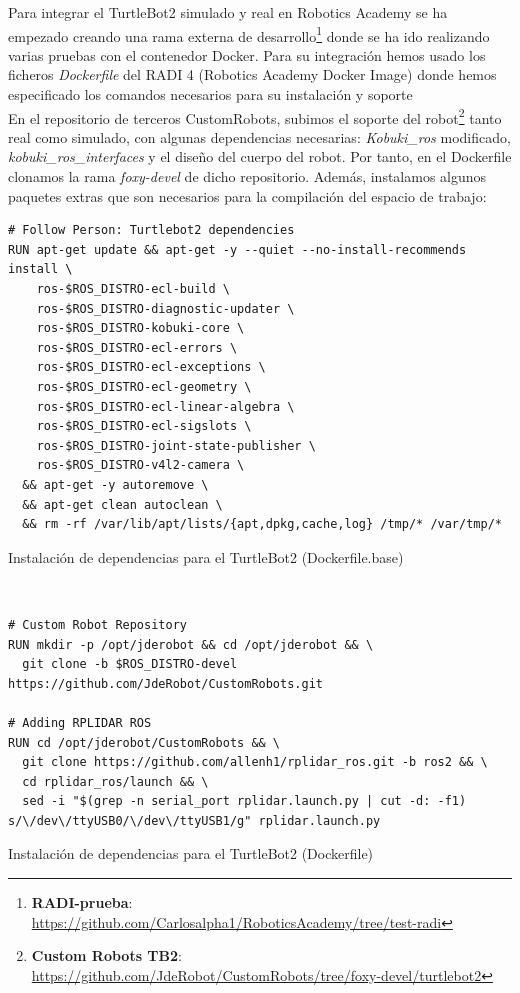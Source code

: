 Para integrar el TurtleBot2 simulado y real en Robotics Academy se ha empezado creando una rama externa de desarrollo\footnote{\textbf{RADI-prueba}: \url{https://github.com/Carlosalpha1/RoboticsAcademy/tree/test-radi}} donde se ha ido realizando varias pruebas con el contenedor Docker. Para su integración hemos usado los ficheros \textit{Dockerfile} del RADI 4 (Robotics Academy Docker Image) donde hemos especificado los comandos necesarios para su instalación y soporte\\

En el repositorio de terceros CustomRobots, subimos el soporte del robot\footnote{\textbf{Custom Robots TB2}: \url{https://github.com/JdeRobot/CustomRobots/tree/foxy-devel/turtlebot2}} tanto real como simulado, con algunas dependencias necesarias: \textit{Kobuki\_ros} modificado, \textit{kobuki\_ros\_interfaces} y el diseño del cuerpo del robot. Por tanto, en el Dockerfile clonamos la rama \textit{foxy-devel} de dicho repositorio. Además, instalamos algunos paquetes extras que son necesarios para la compilación del espacio de trabajo:

\begin{code}[H]
\begin{lstlisting}
# Follow Person: Turtlebot2 dependencies
RUN apt-get update && apt-get -y --quiet --no-install-recommends install \
    ros-$ROS_DISTRO-ecl-build \
    ros-$ROS_DISTRO-diagnostic-updater \
    ros-$ROS_DISTRO-kobuki-core \
    ros-$ROS_DISTRO-ecl-errors \
    ros-$ROS_DISTRO-ecl-exceptions \
    ros-$ROS_DISTRO-ecl-geometry \
    ros-$ROS_DISTRO-ecl-linear-algebra \
    ros-$ROS_DISTRO-ecl-sigslots \
    ros-$ROS_DISTRO-joint-state-publisher \
    ros-$ROS_DISTRO-v4l2-camera \
  && apt-get -y autoremove \
  && apt-get clean autoclean \
  && rm -rf /var/lib/apt/lists/{apt,dpkg,cache,log} /tmp/* /var/tmp/*
\end{lstlisting}
\caption{Instalación de dependencias para el TurtleBot2 (Dockerfile.base)}
\label{fig:instalacion_dependencias_turtlebot2_dockerfile_base}
\end{code}\

\begin{code}[H]
\begin{lstlisting}
# Custom Robot Repository
RUN mkdir -p /opt/jderobot && cd /opt/jderobot && \
  git clone -b $ROS_DISTRO-devel https://github.com/JdeRobot/CustomRobots.git

# Adding RPLIDAR ROS
RUN cd /opt/jderobot/CustomRobots && \
  git clone https://github.com/allenh1/rplidar_ros.git -b ros2 && \
  cd rplidar_ros/launch && \
  sed -i "$(grep -n serial_port rplidar.launch.py | cut -d: -f1) s/\/dev\/ttyUSB0/\/dev\/ttyUSB1/g" rplidar.launch.py
\end{lstlisting}
\caption{Instalación de dependencias para el TurtleBot2 (Dockerfile)}
\label{fig:instalacion_dependencias_turtlebot2_dockerfile}
\end{code}

